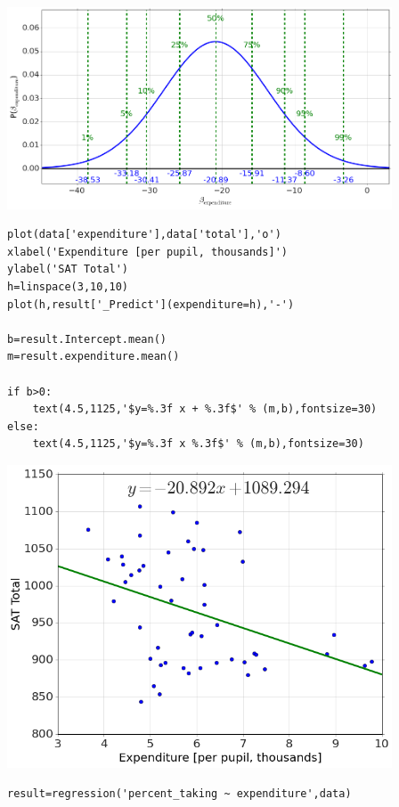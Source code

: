 \begin{center}\includegraphics[width=4.5in]{Regression/Regression_fig5.png}\end{center}

\begin{lstlisting}
plot(data['expenditure'],data['total'],'o')
xlabel('Expenditure [per pupil, thousands]')
ylabel('SAT Total')
h=linspace(3,10,10)
plot(h,result['_Predict'](expenditure=h),'-')

b=result.Intercept.mean()
m=result.expenditure.mean()

if b>0:
    text(4.5,1125,'$y=%.3f x + %.3f$' % (m,b),fontsize=30)
else:
    text(4.5,1125,'$y=%.3f x %.3f$' % (m,b),fontsize=30)

\end{lstlisting}

\begin{center}\includegraphics[width=4.5in]{Regression/Regression_fig6.png}\end{center}

\begin{lstlisting}
result=regression('percent_taking ~ expenditure',data)
\end{lstlisting}

